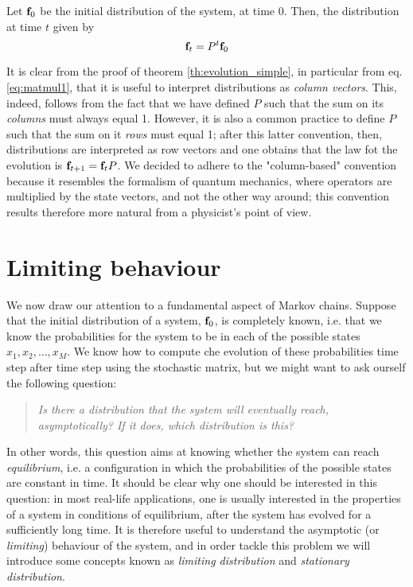 \begin{corollary} \label{th:evolution_complete}
    Let $\mathbf{f}_0$ be the initial distribution of the system, at time 0. Then, the distribution at time $t$ given by
    \begin{equation}
        \mathbf{f}_t = P^t \mathbf{f}_0
    \end{equation}
\end{corollary}

\begin{remark}
    It is clear from the proof of theorem \ref{th:evolution_simple}, in particular from eq. \ref{eq:matmul1}, that it is useful to interpret distributions as \emph{column vectors}. This, indeed, follows from the fact that we have defined $P$ such that the sum on its \emph{columns} must always equal 1. However, it is also a common practice to define $P$ such that the sum on it \emph{rows} must equal 1; after this latter convention, then, distributions are interpreted as row vectors and one obtains that the law fot the evolution is $\mathbf{f}_{t+1} = \mathbf{f}_t P$. We decided to adhere to the "column-based" convention because it resembles the formalism of quantum mechanics, where operators are multiplied by the state vectors, and not the other way around; this convention results therefore more natural from a physicist's point of view.
\end{remark}

\section{Limiting behaviour}
We now draw our attention to a fundamental aspect of Markov chains. Suppose that the initial distribution of a system, $\mathbf{f}_0$, is completely known, i.e. that we know the probabilities for the system to be in each of the possible states $x_1, x_2, \dots, x_M$. We know how to compute che evolution of these probabilities time step after time step using the stochastic matrix, but we might want to ask ourself the following question:
\begin{quote}
    \emph{Is there a distribution that the system will eventually reach, asymptotically? If it does, which distribution is this?}
\end{quote}
In other words, this question aims at knowing whether the system can reach \emph{equilibrium}, i.e. a configuration in which the probabilities of the possible states are constant in time.
It should be clear why one should be interested in this question: in most real-life applications, one is usually interested in the properties of a system in conditions of equilibrium, after the system has evolved for a sufficiently long time. It is therefore useful to understand the asymptotic (or \emph{limiting}) behaviour of the system, and in order tackle this problem we will introduce some concepts known as \emph{limiting distribution} and \emph{stationary distribution}.

